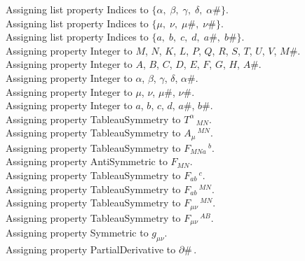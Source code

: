 \documentclass[11pt]{article}
\begin{document}
Assigning list property Indices to $\{\alpha,\; \beta,\; \gamma,\; \delta,\; \alpha\#\}$.
\\
Assigning list property Indices to $\{\mu,\; \nu,\; \mu\#,\; \nu\#\}$.
\\
Assigning list property Indices to $\{a,\; b,\; c,\; d,\; a\#,\; b\#\}$.
\\
Assigning property Integer to $M$, $N$, $K$, $L$, $P$, $Q$, $R$, $S$, $T$, $U$, $V$, $M\#$.
\\
Assigning property Integer to $A$, $B$, $C$, $D$, $E$, $F$, $G$, $H$, $A\#$.
\\
Assigning property Integer to $\alpha$, $\beta$, $\gamma$, $\delta$, $\alpha\#$.
\\
Assigning property Integer to $\mu$, $\nu$, $\mu\#$, $\nu\#$.
\\
Assigning property Integer to $a$, $b$, $c$, $d$, $a\#$, $b\#$.
\\
Assigning property TableauSymmetry to ${T}^{\alpha}\,_{M N}$.
\\
Assigning property TableauSymmetry to ${A}_{\mu}\,^{M N}$.
\\
Assigning property TableauSymmetry to ${F}_{M N a}\,^{b}$.
\\
Assigning property AntiSymmetric to ${F}_{M N}$.
\\
Assigning property TableauSymmetry to ${F}_{a b}\,^{c}$.
\\
Assigning property TableauSymmetry to ${F}_{a b}\,^{M N}$.
\\
Assigning property TableauSymmetry to ${F}_{\mu \nu}\,^{M N}$.
\\
Assigning property TableauSymmetry to ${F}_{\mu \nu}\,^{A B}$.
\\
Assigning property Symmetric to ${g}_{\mu \nu}$.
\\
Assigning property PartialDerivative to $\partial{\#}\, $.
\end{document}
